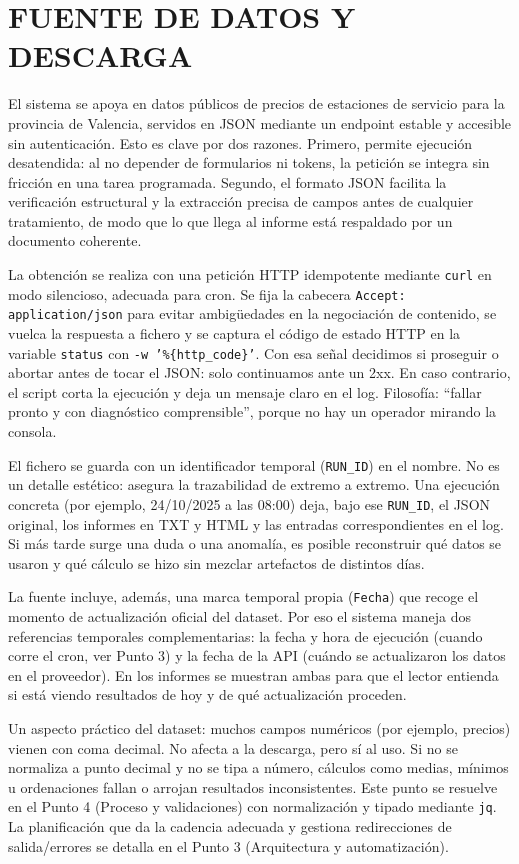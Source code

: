 \chapter{FUENTE DE DATOS Y DESCARGA}

El sistema se apoya en datos públicos de precios de estaciones de servicio para la provincia de Valencia, servidos en JSON mediante un endpoint estable y accesible sin autenticación. Esto es clave por dos razones. Primero, permite ejecución desatendida: al no depender de formularios ni tokens, la petición se integra sin fricción en una tarea programada. Segundo, el formato JSON facilita la verificación estructural y la extracción precisa de campos antes de cualquier tratamiento, de modo que lo que llega al informe está respaldado por un documento coherente.

La obtención se realiza con una petición HTTP idempotente mediante \texttt{curl} en modo silencioso, adecuada para cron. Se fija la cabecera \texttt{Accept: application/json} para evitar ambigüedades en la negociación de contenido, se vuelca la respuesta a fichero y se captura el código de estado HTTP en la variable \texttt{status} con \texttt{-w '\%\{http\_code\}'}. Con esa señal decidimos si proseguir o abortar antes de tocar el JSON: solo continuamos ante un 2xx. En caso contrario, el script corta la ejecución y deja un mensaje claro en el log. Filosofía: ``fallar pronto y con diagnóstico comprensible'', porque no hay un operador mirando la consola.

El fichero se guarda con un identificador temporal (\texttt{RUN\_ID}) en el nombre. No es un detalle estético: asegura la trazabilidad de extremo a extremo. Una ejecución concreta (por ejemplo, 24/10/2025 a las 08:00) deja, bajo ese \texttt{RUN\_ID}, el JSON original, los informes en TXT y HTML y las entradas correspondientes en el log. Si más tarde surge una duda o una anomalía, es posible reconstruir qué datos se usaron y qué cálculo se hizo sin mezclar artefactos de distintos días.

La fuente incluye, además, una marca temporal propia (\texttt{Fecha}) que recoge el momento de actualización oficial del dataset. Por eso el sistema maneja dos referencias temporales complementarias: la fecha y hora de ejecución (cuando corre el cron, ver Punto 3) y la fecha de la API (cuándo se actualizaron los datos en el proveedor). En los informes se muestran ambas para que el lector entienda si está viendo resultados de hoy y de qué actualización proceden.

Un aspecto práctico del dataset: muchos campos numéricos (por ejemplo, precios) vienen con coma decimal. No afecta a la descarga, pero sí al uso. Si no se normaliza a punto decimal y no se tipa a número, cálculos como medias, mínimos u ordenaciones fallan o arrojan resultados inconsistentes. Este punto se resuelve en el Punto 4 (Proceso y validaciones) con normalización y tipado mediante \texttt{jq}. La planificación que da la cadencia adecuada y gestiona redirecciones de salida/errores se detalla en el Punto 3 (Arquitectura y automatización).

